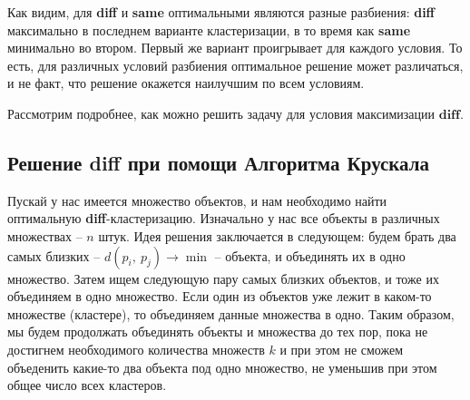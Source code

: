 \documentclass[a4paper,12pt]{article}
\begin{document}
\begin{center}
\end{center}

Как видим, для \textbf{diff} и \textbf{same} оптимальными являются разные разбиения: \textbf{diff} максимально в последнем варианте кластеризации, в то время как \textbf{same} минимально во втором. Первый же вариант проигрывает для каждого условия. То есть, для различных условий разбиения оптимальное решение может различаться, и не факт, что решение окажется наилучшим по всем условиям.

Рассмотрим подробнее, как можно решить задачу для условия максимизации $\textbf{diff}$.

\subsection{Решение diff при помощи Алгоритма Крускала}

Пускай у нас имеется множество объектов, и нам необходимо найти оптимальную \textbf{diff}-кластеризацию. Изначально у нас все объекты в различных множествах -- $n$ штук. Идея решения заключается в следующем: будем брать два самых близких -- $d(p_i,\ p_j) \to \min$ -- объекта, и объединять их в одно множество. Затем ищем следующую пару самых близких объектов, и тоже их объединяем в одно множество. Если один из объектов уже лежит в каком-то множестве (кластере), то объединяем данные множества в одно. Таким образом, мы будем продолжать объединять объекты и множества до тех пор, пока не достигнем необходимого количества множеств $k$ и при этом не сможем объеденить какие-то два объекта под одно множество, не уменьшив при этом общее число всех кластеров.
\end{document}
